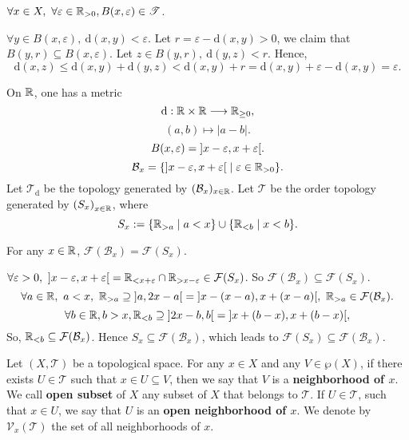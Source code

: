 \begin{propositionenv}
    $\forall x\in X,\ \forall \varepsilon\in \mathbb{R}_{>0}, B(x,\varepsilon)\in \mathscr{T}$.
\end{propositionenv}
\begin{proofenv}
    $\forall y\in B(x,\varepsilon),\ \mathrm{d}(x,y)<\varepsilon$. Let $r=\varepsilon-\mathrm{d}(x,y)>0$, we claim that $B(y,r)\subseteq B(x,\varepsilon)$. Let $z\in B(y,r), \ \mathrm{d}(y,z)<r$. Hence,
    $$\mathrm{d}(x,z)\le \mathrm{d}(x,y)+\mathrm{d}(y,z)<\mathrm{d}(x,y)+r=\mathrm{d}(x,y)+\varepsilon -\mathrm{d}(x,y)=\varepsilon.$$
\end{proofenv}
\begin{remark}
    On $\mathbb{R}$, one has a metric 
    $$\mathrm{d}: \mathbb{R}\times \mathbb{R}\longrightarrow \mathbb{R}_{\ge 0},$$
    $$\left(a,b\right)\longmapsto |a-b|.$$
    $$B(x,\varepsilon)=\interval[open]{x-\varepsilon}{x+\varepsilon}.$$
    $$\mathcal{B}_x=\{\interval[open]{x-\varepsilon}{x+\varepsilon}\mid \varepsilon\in \RR_{>0}\}.$$
    Let $\mathscr{T}_\mathrm{d}$ be the topology generated by $(\mathcal{B}_x)_{x\in \mathbb{R}}$. Let $\mathscr{T}$ be the order topology generated by $\left(S_x\right)_{x\in \mathbb{R}}$, where 
    $$S_x:=\{\mathbb{R}_{>a}\mid a<x\}\cup \{\mathbb{R}_{<b}\mid x<b\}.$$
\end{remark}
\begin{propositionenv}
    For any $x\in \mathbb{R}$, $\mathcal{F}(\mathcal{B}_x)=\mathcal{F}(S_x)$.
\end{propositionenv}
\begin{proofenv}
    $\forall \varepsilon>0,\ \interval[open]{x-\varepsilon}{x+\varepsilon}=\RR_{<x+\varepsilon}\cap \RR_{>x-\varepsilon}\in \mathcal{F}(S_x)$. So $\mathcal{F}(\mathcal{B}_x)\subseteq \mathcal{F}(S_x)$.
    $$\forall a\in \RR,\ a<x,\ \RR_{>a}\supseteq \interval[open]{a}{2x-a}=\interval[open]{x-(x-a)}{x+(x-a)},\ \RR_{>a}\in \mathcal{F}(\mathcal{B}_x).$$
    $$\forall b\in \RR, b>x,\RR_{<b}\supseteq \interval[open]{2x-b}{b}=\interval[open]{x+(b-x)}{x+(b-x)},$$
    So, $\mathbb{R}_{<b}\subseteq\mathcal{F}(\mathcal{B}_x)$. Hence $S_x\subseteq \mathcal{F}(\mathcal{B}_x)$, which leads to $\mathcal{F}(S_x)\subseteq\mathcal{F}(\mathcal{B}_x)$.
\end{proofenv}
\begin{definitionenv}
    Let $(X,\mathscr{T})$ be a topological space. For any $x\in X$ and any $V\in \wp(X)$, if there exists $U\in \mathscr{T}$ such that $x\in U\subseteq V$, then we say that $V$ is a \textbf{neighborhood of $x$}. We call \textbf{open subset} of $X$ any subset of $X$ that belongs to $\mathscr{T}$. If $U\in \mathscr{T}$, such that $x\in U$, we say that $U$ is an \textbf{open neighborhood of $x$}. We denote by $\mathcal{V}_x(\mathscr{T})$ the set of all neighborhoods of $x$.
\end{definitionenv}
